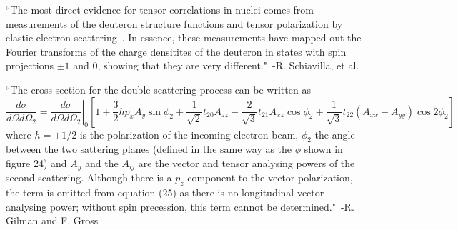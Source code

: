 ``The most direct evidence for tensor correlations in nuclei comes from measurements of the deuteron structure functions and tensor polarization by elastic electron scattering~\cite{Gilman:2001yh}. In essence, these measurements have mapped out the Fourier transforms of the charge densitites of the deuteron in states with spin projections $\pm1$ and 0, showing that they are very different."~-R. Schiavilla, et al.~\cite{Schiavilla:2006xx}


``The cross section for the double scattering process can be written as~\cite{Arnold:1979cg}
\begin{dmath}
	\frac{d\sigma}{d\Omega d\Omega_2} = \left. \frac{d\sigma}{d\Omega d\Omega_2}\right|_0 \left[1 + \frac{3}{2}hp_xA_y\sin{\phi_2} + \frac{1}{\sqrt{2}}t_{20}A_{zz} - \frac{2}{\sqrt{3}}t_{21}A_{xz}\cos{\phi_2}+\frac{1}{\sqrt{3}}t_{22}\left( A_{xx} - A_{yy} \right) \cos{2\phi_2}  \right]
\end{dmath}
where $h=\pm 1/2$ is the polarization of the incoming electron beam, $\phi_2$ the angle between the two sattering planes (defined in the same way as the $\phi$ shown in figure 24) and $A_y$ and the $A_{ij}$ are the vector and tensor analysing powers of the second scattering. Although there is a $p_z$ component to the vector polarization, the term is omitted from equation (25) as there is no longitudinal vector analysing power; without spin precession, this term cannot be determined."~-R. Gilman and F. Gross~\cite{Gilman:2001yh}